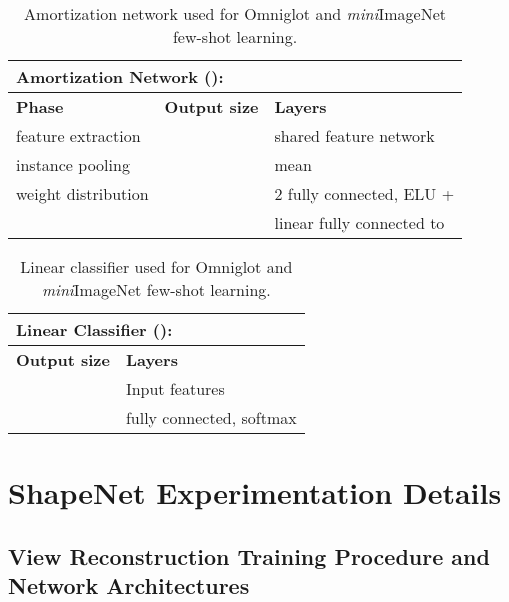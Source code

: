 \documentclass{article}
\begin{document}
\begin{table}[h]
    \caption{Amortization network used for Omniglot and \textit{mini}ImageNet few-shot learning.}
	\centering
	\begin{tabular}{lcl}
	  \multicolumn{3}{l}{\textbf{Amortization Network ():} } \\
      \toprule
      \textbf{Phase} & \textbf{Output size} & \textbf{Layers} \\
      \midrule
      feature extraction &  & shared feature network  \\
    instance pooling &  & mean \\
     weight distribution &  & 2  fully connected, ELU + \\
    & &  linear fully connected to  \\
      \bottomrule
	\end{tabular}
    \vspace{2mm}
	\label{table:amortization_network_omniglot}
\end{table}

\begin{table}[h]
    \caption{Linear classifier used for Omniglot and \textit{mini}ImageNet few-shot learning.}
	\centering
	\begin{tabular}{ll}
		\multicolumn{2}{l}{\textbf{Linear Classifier ():} } \\
 		\toprule
        \textbf{Output size} & \textbf{Layers} \\
        \midrule
		 & Input features \\
		 & fully connected, softmax \\ 
		\bottomrule
	\end{tabular}
    \vspace{2mm}
	\label{table:linear_classifier_omniglot}
\end{table}
\section{ShapeNet Experimentation Details}
\label{app:experimental_details_shapenet}
\setcounter{figure}{0}  
\setcounter{table}{0}
\setcounter{equation}{0}

\subsection{View Reconstruction Training Procedure and  Network Architectures}
\label{app:view_reconstruction_networks}
\end{document}
